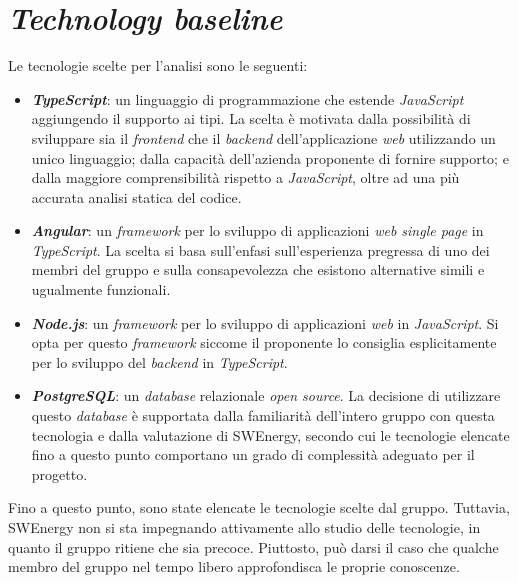 \section{\textit{Technology baseline}}
Le tecnologie scelte per l'analisi sono le seguenti:

\begin{itemize}
	\item \textbf{\textit{TypeScript}}: un linguaggio di programmazione che
	      estende \textit{JavaScript} aggiungendo il supporto ai tipi. La scelta
	      è motivata dalla possibilità di sviluppare sia il \textit{frontend}
	      che il \textit{backend} dell'applicazione \textit{web} utilizzando un
	      unico linguaggio; dalla capacità dell'azienda proponente di fornire
	      supporto; e dalla maggiore comprensibilità rispetto a
	      \textit{JavaScript}, oltre ad una più accurata analisi statica del
	      codice.

	\item \textbf{\textit{Angular}}: un \textit{framework} per lo sviluppo di
	      applicazioni \textit{web single page} in \textit{TypeScript}. La
	      scelta si basa sull'enfasi sull'esperienza pregressa di uno dei membri
	      del gruppo e sulla consapevolezza che esistono alternative simili e
	      ugualmente funzionali.

	\item \textbf{\textit{Node.js}}: un \textit{framework} per lo sviluppo di
	      applicazioni \textit{web} in \textit{JavaScript}. Si opta per questo
	      \textit{framework} siccome il proponente lo consiglia esplicitamente per lo
	      sviluppo del \textit{backend} in \textit{TypeScript}.

	\item \textbf{\textit{PostgreSQL}}: un \textit{database} relazionale
	      \textit{open source}. La decisione di utilizzare questo
	      \textit{database} è supportata dalla familiarità dell'intero gruppo
	      con questa tecnologia e dalla valutazione di SWEnergy, secondo cui le
	      tecnologie elencate fino a questo punto comportano un grado di
	      complessità adeguato per il progetto.
\end{itemize}

Fino a questo punto, sono state elencate le tecnologie scelte dal gruppo.
Tuttavia, SWEnergy non si sta impegnando attivamente allo studio delle
tecnologie, in quanto il gruppo ritiene che sia precoce. Piuttosto, può darsi
il caso che qualche membro del gruppo nel tempo libero approfondisca le proprie
conoscenze.
